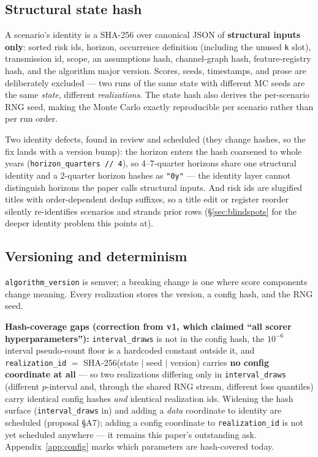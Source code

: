 \documentclass[11pt]{article}
\begin{document}
\subsection{Structural state hash}
\label{sec:statehash}

A scenario's identity is a SHA-256 over canonical JSON of \textbf{structural
inputs only}: sorted risk ids, horizon, occurrence definition (including the
unused \texttt{k} slot), transmission id, scope, an assumptions hash,
channel-graph hash, feature-registry hash, and the algorithm major version.
Scores, seeds, timestamps, and prose are deliberately excluded --- two runs
of the same state with different MC seeds are the same \emph{state},
different \emph{realizations}. The state hash also derives the per-scenario
RNG seed, making the Monte Carlo exactly reproducible per scenario rather
than per run order.

Two identity defects, found in review and scheduled (they change hashes, so
the fix lands with a version bump): the horizon enters the hash coarsened to
whole years (\texttt{horizon\_quarters // 4}), so 4--7-quarter horizons
share one structural identity and a 2-quarter horizon hashes as
\texttt{"0y"} --- the identity layer cannot distinguish horizons the paper
calls structural inputs. And risk ids are slugified titles with
order-dependent dedup suffixes, so a title edit or register reorder silently
re-identifies scenarios and strands prior rows (\S\ref{sec:blindspots} for
the deeper identity problem this points at).

\subsection{Versioning and determinism}
\label{sec:versioning}

\texttt{algorithm\_version} is semver; a breaking change is one where score
components change meaning. Every realization stores the version, a config
hash, and the RNG seed.

\textbf{Hash-coverage gaps (correction from v1, which claimed ``all scorer
hyperparameters''):} \texttt{interval\_draws} is not in the config hash, the
$10^{-6}$ interval pseudo-count floor is a hardcoded constant outside it,
and \texttt{realization\_id} $=$ SHA-256(state $\mid$ seed $\mid$ version)
carries \textbf{no config coordinate at all} --- so two realizations
differing only in \texttt{interval\_draws} (different $p$-interval and,
through the shared RNG stream, different loss quantiles) carry identical
config hashes \emph{and} identical realization ids. Widening the hash
surface (\texttt{interval\_draws} in) and adding a \emph{data} coordinate to
identity are scheduled (proposal \S A7); adding a config coordinate to
\texttt{realization\_id} is not yet scheduled anywhere --- it remains this
paper's outstanding ask. Appendix~\ref{app:config} marks which parameters
are hash-covered today.
\end{document}
